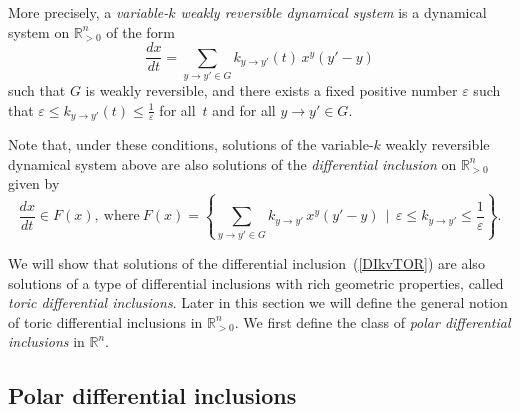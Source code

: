 \documentclass[12pt,letterpaper]{article}
\newcommand{\RR}{\mathbb{R}}
\newcommand{\eps}{\varepsilon}
\begin{document}
More precisely, a {\em variable-$k$  weakly reversible dynamical system} is a dynamical system on $\RR^n_{>0}$ of the form 
\begin{equation}\label{kvTOR}
\frac{dx}{dt} = \sum_{y\to y'\in G}k_{y\to y'}(t) \, x^{y} (y' - y) 
\end{equation}
such that $G$ is weakly reversible, and there exists a fixed positive number $\eps$ such that  $\eps \le k_{y \to y'}(t) \le \frac{1}{\eps}$ for all~$t$ and for all $y\to y'\in G$. 


Note that, under these conditions, solutions of the variable-$k$  weakly reversible dynamical system above are also solutions of the {\em differential inclusion} on $\RR^n_{>0}$ given by 
\begin{equation}\label{DIkvTOR}
\frac{dx}{dt} \in F(x), \mathrm{\ where \ } F(x) = \left\{  \sum_{y\to y'\in G}k_{y\to y'} \, x^{y} (y' - y)  \ \ | \ \ \eps \le k_{y\to y'} \le \frac{1}{\eps} \right\}. 
\end{equation}

We will show that solutions of the differential inclusion~(\ref{DIkvTOR}) are also solutions of a type of differential inclusions with rich geometric properties, called {\it toric differential inclusions}.
Later in this section we will define the general notion of toric differential inclusions in $\RR^n_{>0}$. 
We first define the class of {\em polar differential inclusions} in $\RR^n$.
























\subsection{Polar differential inclusions}


\end{document}
